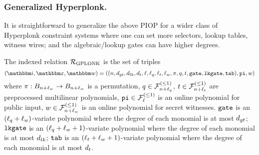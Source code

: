 \subsubsection*{Generalized Hyperplonk.}
It is straightforward to generalize the above PIOP for a wider class of Hyperplonk constraint systems 
where one can set more selectors, lookup tables, witness wires; and the algebraic/lookup gates can have higher degrees.


\begin{definition}
    The indexed relation ${\mathcal{R}}_{\text{GPLONK}}$ is the set of triples 
    \[
        (\idxR, \instR, \witR) = 
            ((n, \dgate, \dlk, \dtab, 
              \ell, \lsel, \ltab, \lwit, 
              \perm, \sel, \tabp, 
              \gatep, \lgatep, \ltabp), 
            \pubinp, 
            \witp)
    \]
    where $\pi : B_{n+\ell_w} \rightarrow B_{n+\ell_w}$
    is a permutation, $q \in {\mathcal{F}}_{n+\ell_q}^{(\le{1})}$, $t \in {\mathcal{F}}_{n+\ell_t}^{(\le{1})}$ are preprocessed 
    multilinear polynomials, $\mathtt{pi} \in {\mathcal{F}}_{\ell}^{(\le{1})}$ is an 
    online polynomial for public input, $w \in {\mathcal{F}}_{n+\ell_w}^{(\le{1})}$
    is an online polynomial for secret witnesses. 
    $\mathtt{gate}$ is an $(\ell_q+\ell_w)$-variate polynomial where the degree of each monomial
    is at most $d_{gt}$;
    $\mathtt{lkgate}$ is an $(\ell_q+\ell_w+1)$-variate polynomial where the degree of each monomial
    is at most $d_{lk}$;
    $\mathtt{tab}$ is an $(\ell_t+\ell_w+1)$-variate polynomial where the degree of each monomial 
    is at most $d_t$.
    

\end{definition}
